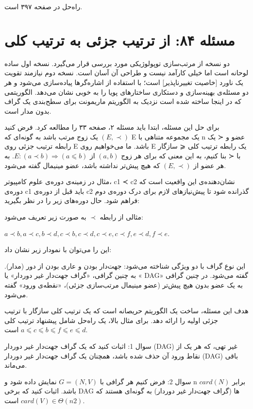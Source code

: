 \documentclass{book} %
\begin{document}
راه‌حل در صفحه ۳۹۷ است.

\newpage

\section {مسئله ۸۴: از ترتیب جزئی به ترتیب کلی}

دو نسخه از مرتب‌سازی توپولوژیکی مورد بررسی قرار می‌گیرد. نسخه اول ساده لوحانه است
اما خیلی کارآمد نیست و طراحی آن آسان است. نسخه دوم نیازمند تقویت یک ناورد [خاصیت
تغییرناپذیر] است؛ با استفاده از اشاره‌گرها پیاده‌سازی می‌شود و هر دو مسئله‌ی بهینه‌سازی و
دستکاری ساختارهای پویا را به خوبی نشان می‌دهد. الگوریتمی که در اینجا ساخته شده است
نزدیک به الگوریتم ماریمونت برای سطح‌بندی یک گراف بدون مدار است.

برای حل این مسئله، ابتدا باید مسئله ۲، صفحه ۳۳ را مطالعه کرد.
فرض کنید $(E, ≺)$ یک زوج مرتب باشد به گونه‌ای که E یک مجموعه متناهی با n عضو
و ≺ یک رابطه ترتیب جزئی روی E باشد. ما می‌خواهیم روی E یک رابطه ترتیب کلی
⩽ سازگار با ≺ بنا کنیم، به این معنی که برای هر زوج $(a, b)$ از $E: (a ≺ b) ⇒ (a ⩽ b)$.
به هر عضو از $(E, ≺)$ که هیچ پیش‌تر نداشته باشد، عضو مینیمال گفته می‌شود.


مثال
در زمینه‌ی دوره‌ی علوم کامپیوتر، c1 ≺ c2 نشان‌دهنده‌ی این واقعیت است که دوره‌ی c1 باید
قبل از دوره‌ی c2 گذرانده شود تا پیش‌نیازهای لازم برای درک دوره‌ی دوم فراهم شود.
حال دوره‌های زیر را در نظر بگیرید:


مثالی از رابطه $≺$ به صورت زیر تعریف می‌شود:

$a ≺ b, a ≺ c, b ≺ d, c ≺ b, c ≺ d, c ≺ e, c ≺ f, e ≺ d, f ≺ e$.

این را می‌توان با نمودار زیر نشان داد:

این نوع گراف با دو ویژگی شناخته می‌شود: جهت‌دار بودن و عاری بودن از دور
(مدار). به چنین گرافی، «گراف جهت‌دار غیر دوردار» یا « DAG» گفته می‌شود. در چنین
گرافی به یک عضو بدون هیچ پیش‌تر (عضو مینیمال مرتب‌سازی جزئی)، «نقطه‌ی ورود»
گفته می‌شود.

هدف این مسئله، ساخت یک الگوریتم حریصانه است که یک ترتیب کلی سازگار با ترتیب جزئی اولیه را ارائه دهد. برای مثال بالا، یک راه‌حل شامل پیشنهاد ترتیب کلی $a ⩽ c ⩽ b ⩽ f ⩽ e ⩽ d$ است.

سوال 1: اثبات کنید که یک گراف جهت‌دار غیر دوردار (DAG) غیر تهی، که هر یک از نقاط ورود آن حذف
شده باشد، همچنان یک گراف جهت‌دار غیر دوردار (DAG) باقی می‌ماند.


سوال 2: فرض کنیم هر گرافی با $G = (N, V)$ نمایش داده شود و n برابر $card(N)$ باشد.
اثبات کنید که برخی DAG ها (گراف جهت‌دار غیر دوردار) به گونه‌ای هستند که $card(V) ∈ Θ(n2)$
است.
\end{document}
